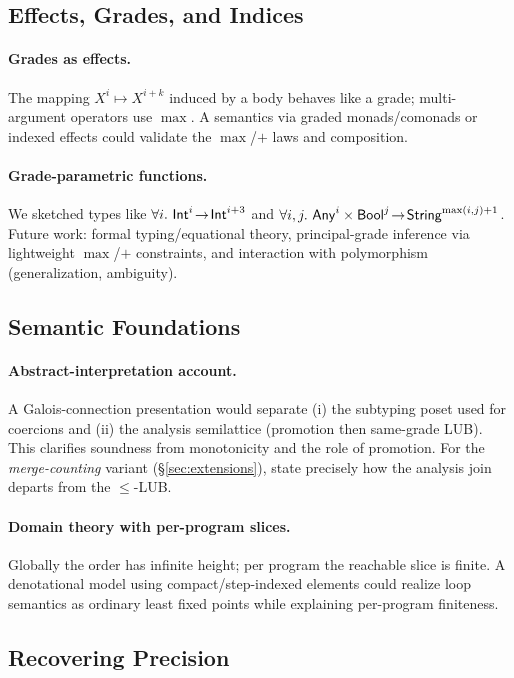 \subsection{Effects, Grades, and Indices}
\paragraph{Grades as effects.}
The mapping $X^{i}\mapsto X^{i+k}$ induced by a body behaves like a grade; multi-argument operators use $\max$. A semantics via graded monads/comonads or indexed effects could validate the $\max$/$+$ laws and composition.

\paragraph{Grade-parametric functions.}
We sketched types like $\forall i.\ \Int^i\!\to\!\Int^{i+3}$ and $\forall i,j.\ \mathsf{Any}^i\times\mathsf{Bool}^j\!\to\!\mathsf{String}^{\max(i,j)+1}$. Future work: formal typing/equational theory, principal-grade inference via lightweight $\max$/$+$ constraints, and interaction with polymorphism (generalization, ambiguity).

\subsection{Semantic Foundations}
\paragraph{Abstract-interpretation account.}
A Galois-connection presentation would separate (i) the subtyping poset used for coercions and (ii) the analysis semilattice (promotion then same-grade LUB). This clarifies soundness from monotonicity and the role of promotion. For the \emph{merge-counting} variant (\S\ref{sec:extensions}), state precisely how the analysis join departs from the $\le$-LUB.

\paragraph{Domain theory with per-program slices.}
Globally the order has infinite height; per program the reachable slice is finite. A denotational model using compact/step-indexed elements could realize loop semantics as ordinary least fixed points while explaining per-program finiteness.

\subsection{Recovering Precision}

